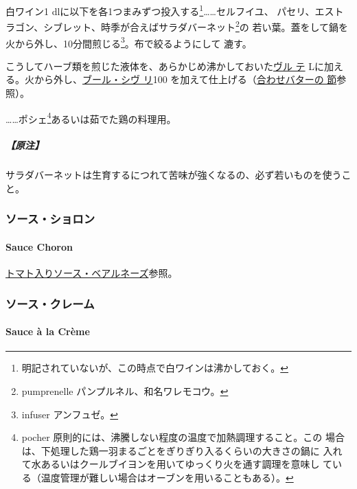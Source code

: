 \begin{recette}
白ワイン1\undemi{} dlに以下を各1つまみずつ投入する\footnote{明記されていないが、この時点で白ワインは沸かしておく。}\ldots{}\ldots{}セルフイユ、
パセリ、エストラゴン、シブレット、時季が合えばサラダバーネット\footnote{pumprenelle
  パンプルネル、和名ワレモコウ。}の
若い葉。蓋をして鍋を火から外し、10分間煎じる\footnote{infuser
  アンフュゼ。}。布で絞るようにして 漉す。

こうしてハーブ類を煎じた液体を、あらかじめ沸かしておいた\protect\hyperlink{veloute}{ヴル
テ}\troisquarts{}
Lに加える。火から外し、\protect\hyperlink{beurre-a-la-chivry}{ブール・シヴ
リ}100
を加えて仕上げる（\protect\hyperlink{beurres-composes}{合わせバターの
節}参照）。

\ldots{}\ldots{}ポシェ\footnote{pocher
  原則的には、沸騰しない程度の温度で加熱調理すること。この
  場合は、下処理した鶏一羽まるごとをぎりぎり入るくらいの大きさの鍋に
  入れて水あるいはクールブイヨンを用いてゆっくり火を通す調理を意味し
  ている（温度管理が難しい場合はオーブンを用いることもある）。}あるいは茹でた鶏の料理用。

\hypertarget{ux539fux6ce8-5}{%
\subparagraph{【原注】}\label{ux539fux6ce8-5}}

サラダバーネットは生育するにつれて苦味が強くなるの、必ず若いものを使うこと。

\maeaki

\hypertarget{ux30bdux30fcux30b9ux30b7ux30e7ux30edux30f3}{%
\subsubsection{ソース・ショロン}\label{ux30bdux30fcux30b9ux30b7ux30e7ux30edux30f3}}

\hypertarget{sauce-choron}{%
\paragraph{Sauce Choron}\label{sauce-choron}}

\protect\hyperlink{sauce-bearnaise-tomatee}{トマト入りソース・ベアルネーズ}参照。

\maeaki

\hypertarget{ux30bdux30fcux30b9ux30afux30ecux30fcux30e0}{%
\subsubsection{ソース・クレーム}\label{ux30bdux30fcux30b9ux30afux30ecux30fcux30e0}}

\hypertarget{sauce-creme}{%
\paragraph{Sauce à la Crème}\label{sauce-creme}}


\end{recette}
